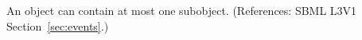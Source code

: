 An \Event object can contain at most one \Delay subobject. (References:
SBML L3V1 Section~\ref{sec:events}.)
